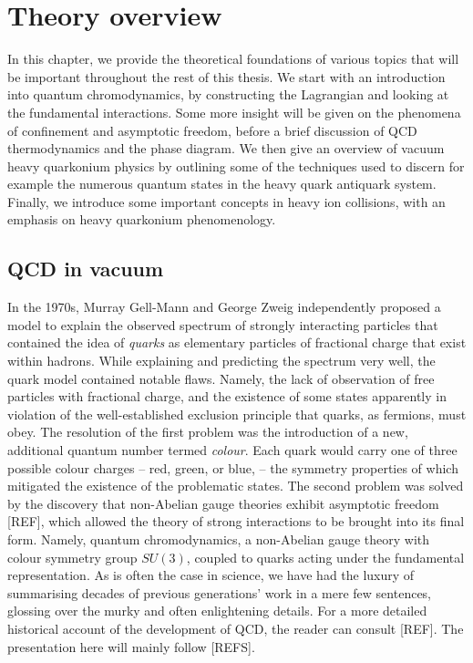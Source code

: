 \documentclass[12pt, a4paper, twoside]{book}
\newcommand{\brac}[1] {\!\left(#1\right)}
\begin{document}
\chapter{Theory overview}
\label{sec:theory_ov}
\onehalfspacing
In this chapter, we provide the theoretical foundations of various topics that will be important throughout the rest of this thesis. We start with an introduction into quantum chromodynamics, by constructing the Lagrangian and looking at the fundamental interactions. Some more insight will be given on the phenomena of confinement and asymptotic freedom, before a brief discussion of QCD thermodynamics and the phase diagram. We then give an overview of vacuum heavy quarkonium physics by outlining some of the techniques used to discern for example the numerous quantum states in the heavy quark antiquark system. Finally, we introduce some important concepts in heavy ion collisions, with an emphasis on heavy quarkonium phenomenology. 
\section{QCD in vacuum}
In the 1970s, Murray Gell-Mann and George Zweig independently proposed a model to explain the observed spectrum of strongly interacting particles that contained the idea of \emph{quarks} as elementary particles of fractional charge that exist within hadrons. While explaining and predicting the spectrum very well, the quark model contained notable flaws. Namely, the lack of observation of free particles with fractional charge, and the existence of some states apparently in violation of the well-established exclusion principle that quarks, as fermions, must obey. The resolution of the first problem was the introduction of a new, additional quantum number termed \emph{colour}. Each quark would carry one of three possible colour charges -- red, green, or blue, -- the symmetry properties of which mitigated the existence of the problematic states. The second problem was solved by the discovery that non-Abelian gauge theories exhibit asymptotic freedom [REF], which allowed the theory of strong interactions to be brought into its final form. Namely, quantum chromodynamics, a non-Abelian gauge theory with colour symmetry group \(SU\brac{3}\), coupled to quarks acting under the fundamental representation. As is often the case in science, we have had the luxury of summarising decades of previous generations' work in a mere few sentences, glossing over the murky and often enlightening details. For a more detailed historical account of the development of QCD, the reader can consult [REF]. The presentation here will mainly follow [REFS].
\end{document}
